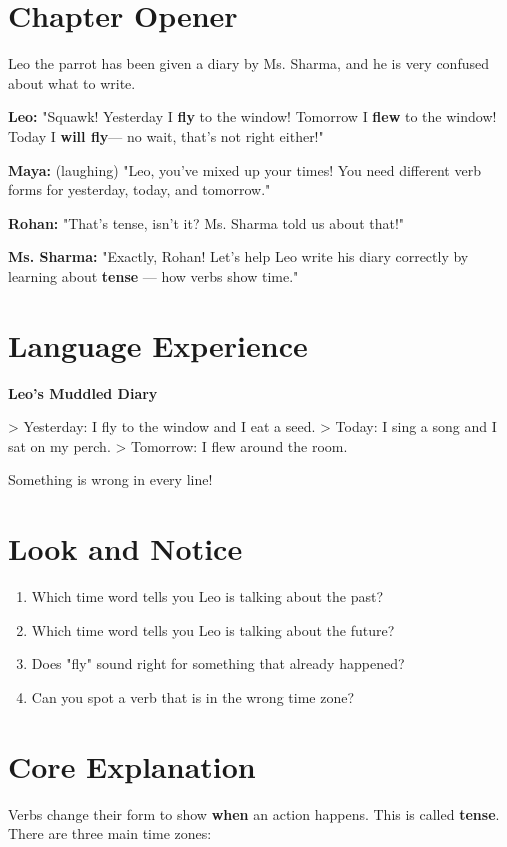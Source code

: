 \section{Chapter Opener}
Leo the parrot has been given a diary by Ms. Sharma, and he is very confused about what to write.

\textbf{Leo:} "Squawk! Yesterday I \textbf{fly} to the window! Tomorrow I \textbf{flew} to the window! Today I \textbf{will fly}— no wait, that's not right either!"

\textbf{Maya:} (laughing) "Leo, you've mixed up your times! You need different verb forms for yesterday, today, and tomorrow."

\textbf{Rohan:} "That's tense, isn't it? Ms. Sharma told us about that!"

\textbf{Ms. Sharma:} "Exactly, Rohan! Let's help Leo write his diary correctly by learning about \textbf{tense} — how verbs show time."

\section{Language Experience}
\textbf{Leo's Muddled Diary}

> Yesterday: I fly to the window and I eat a seed.
> Today: I sing a song and I sat on my perch.
> Tomorrow: I flew around the room.

Something is wrong in every line!

\section{Look and Notice}
\begin{thinkbox}
    \begin{enumerate}
        \item Which time word tells you Leo is talking about the past?
        \item Which time word tells you Leo is talking about the future?
        \item Does "fly" sound right for something that already happened?
        \item Can you spot a verb that is in the wrong time zone?
    \end{enumerate}
\end{thinkbox}

\section{Core Explanation}
Verbs change their form to show \textbf{when} an action happens. This is called \textbf{tense}. There are three main time zones:

